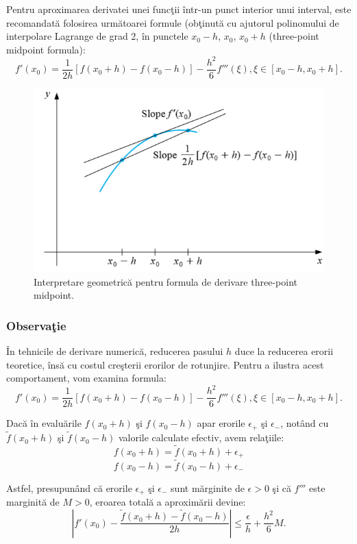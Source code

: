 \documentclass{exam}
\begin{document}
Pentru aproximarea derivatei unei func\c{t}ii \^{i}ntr-un punct interior unui interval, este recomandat\u{a} folosirea urm\u{a}toarei formule (ob\c{t}inut\u{a} cu ajutorul polinomului de interpolare Lagrange de grad 2, \^{i}n punctele $x_0-h$, $x_0$, $x_0+h$ (three-point midpoint formula):
$$f'(x_0)=\frac{1}{2h}\left[f(x_0+h)-f(x_0-h)\right]-\frac{h^2}{6}f'''(\xi), \xi \in [x_0-h, x_0+h].$$

\begin{figure}[ht]

	\begin{center}
		\includegraphics[width=0.5\columnwidth]{./img/d_three}
		\caption{Interpretare geometrică pentru formula de derivare three-point midpoint.}
	\end{center}
\end{figure}

\subsubsection{Observaţie}

\^{I}n tehnicile de derivare numeric\u{a}, reducerea pasului $h$ duce la reducerea erorii teoretice, îns\u{a} cu costul cre\c{s}terii erorilor de rotunjire. Pentru a ilustra acest comportament, vom examina formula:
$$f'(x_0)=\frac{1}{2h}\left[f(x_0+h)-f(x_0-h)\right]-\frac{h^2}{6}f'''(\xi), \xi \in [x_0-h, x_0+h].$$

Dac\u{a} \^{i}n evalu\u{a}rile $f(x_0+h)$ \c{s}i $f(x_0-h)$ apar erorile $\epsilon_+$ \c{s}i $\epsilon_-$, not\^{a}nd cu $\tilde{f}(x_0+h)$ \c{s}i $\tilde{f}(x_0-h)$ valorile calculate efectiv, avem rela\c{t}iile:
$$f(x_0+h) = \tilde{f}(x_0+h)+\epsilon_+$$
$$f(x_0-h) = \tilde{f}(x_0-h)+\epsilon_-$$

Astfel, presupun\^{a}nd c\u{a} erorile $\epsilon_+$ \c{s}i $\epsilon_-$ sunt m\u{a}rginite de $\epsilon>0$ \c{s}i c\u{a} $f'''$ este marginit\u{a} de $M>0$, eroarea total\u{a} a aproxim\u{a}rii devine:
$$\left|f'(x_0) -\frac{\tilde{f}(x_0+h)-\tilde{f}(x_0-h)}{2h}\right|\leq\frac{\epsilon}{h}+\frac{h^2}{6}M.$$
\end{document}
